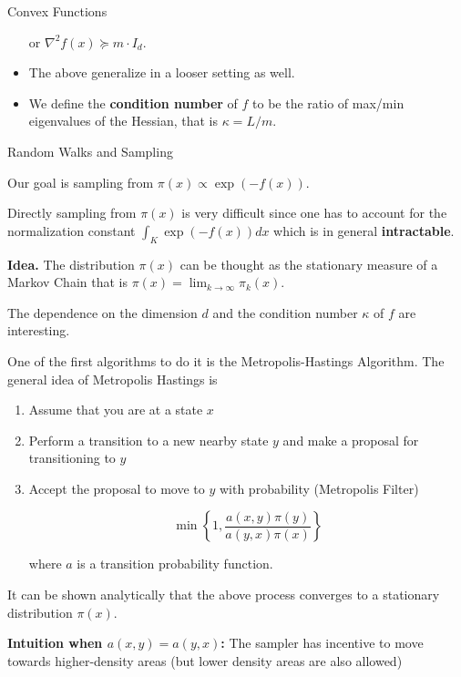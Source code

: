 \documentclass[10pt]{beamer}
\begin{document}
\begin{frame}[allowframebreaks]{Convex Functions}
\begin{itemize}
    or $\nabla^2 f(x) \succeq m \cdot I_d$.
    
    \item The above generalize in a looser setting as well.     
    
    \item We define the \textbf{condition number} of $f$ to be the ratio of max/min eigenvalues of the Hessian, that is $\kappa = L / m$.
    
\end{itemize}
\end{frame}

\begin{frame}[allowframebreaks]{Random Walks and Sampling}

    Our goal is sampling from $\pi(x) \propto \exp(-f(x))$. 
    
    \medskip
    
    Directly sampling from $\pi(x)$ is very difficult since one has to account for the normalization constant $\int_K \exp(-f(x)) d x$ which is in general \textbf{intractable}. 
    
    \medskip
    
    \textbf{Idea.} The distribution $\pi(x)$ can be thought as the stationary measure of a Markov Chain that is $\pi(x) = \lim_{k \to \infty} \pi_k(x)$. 

    \medskip

    The dependence on the dimension $d$ and the condition number $\kappa$ of $f$ are interesting.
    
    \framebreak
    
    One of the first algorithms to do it is the Metropolis-Hastings Algorithm. The general idea of Metropolis Hastings is 
    
    \begin{enumerate}
        \item Assume that you are at a state $x$ 
        \item Perform a transition to a new nearby state $y$ and make a proposal for transitioning to $y$
        \item Accept the proposal to move to $y$ with probability (Metropolis Filter)
        
        $$\min \left  \{ 1, \frac { a (x, y) \pi(y) } {a (y, x) \pi (x)} \right \}$$
        
        where $a$ is a transition probability function. 
        
    \end{enumerate}
    
    It can be shown analytically that the above process converges to a stationary distribution $\pi(x)$.
    
    \textbf{Intuition when $a(x,y) = a(y,x)$:} The sampler has incentive to move towards higher-density areas (but lower density areas are also allowed)
    
\end{frame}
\end{document}
